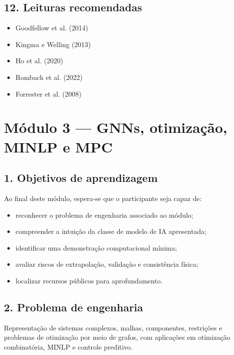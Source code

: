 \documentclass[
  brazilian,
  a4paper,
  DIV=11,
  numbers=noendperiod]{scrreprt}
\providecommand{\tightlist}{%
  \setlength{\itemsep}{0pt}\setlength{\parskip}{0pt}}
\begin{document}
\section{12. Leituras recomendadas}\label{leituras-recomendadas-1}

\begin{itemize}
\tightlist
\item
  Goodfellow et al. (2014)
\item
  Kingma e Welling (2013)
\item
  Ho et al. (2020)
\item
  Rombach et al. (2022)
\item
  Forrester et al. (2008)
\end{itemize}

\chapter{Módulo 3 --- GNNs, otimização, MINLP e
MPC}\label{muxf3dulo-3-gnns-otimizauxe7uxe3o-minlp-e-mpc}

\section{1. Objetivos de
aprendizagem}\label{objetivos-de-aprendizagem-2}

Ao final deste módulo, espera-se que o participante seja capaz de:

\begin{itemize}
\tightlist
\item
  reconhecer o problema de engenharia associado ao módulo;
\item
  compreender a intuição da classe de modelo de IA apresentada;
\item
  identificar uma demonstração computacional mínima;
\item
  avaliar riscos de extrapolação, validação e consistência física;
\item
  localizar recursos públicos para aprofundamento.
\end{itemize}

\section{2. Problema de engenharia}\label{problema-de-engenharia-2}

Representação de sistemas complexos, malhas, componentes, restrições e
problemas de otimização por meio de grafos, com aplicações em otimização
combinatória, MINLP e controle preditivo.
\end{document}
